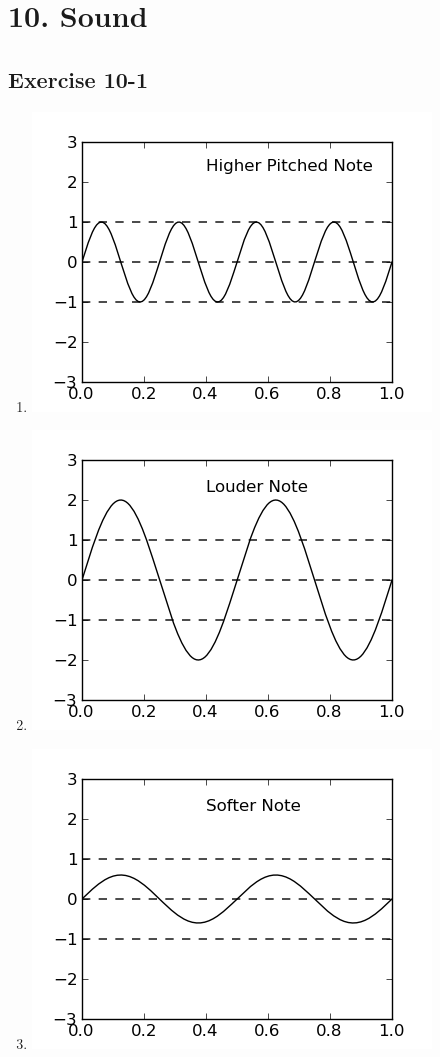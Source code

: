 \section {10. Sound}
\subsection{Exercise 10-1} 
\begin{multicols}{3}
  \begin{enumerate}[noitemsep, label=\textbf{\arabic*}. ]
  \item 
\includegraphics[width=.3\textwidth]{photos/long_waves_note1.png}
  \item 
\includegraphics[width=.3\textwidth]{photos/long_waves_note2.png}
\item
\includegraphics[width=.3\textwidth]{photos/long_waves_note3.png}
\end{enumerate}
\end{multicols}

